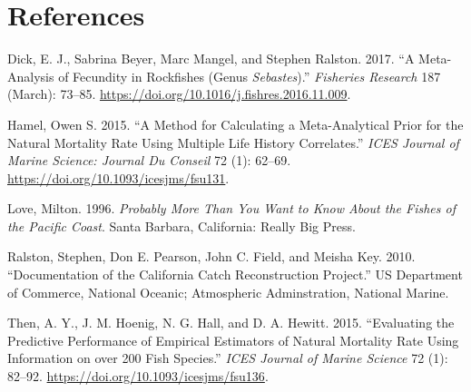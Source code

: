 \documentclass[11pt,
  english,
  a4paper,
]{article}
\begin{document}
\tagmcend\tagstructend

\clearpage


\hypertarget{references}{%
\section{References}\label{references}}

\leavevmode\tagmcend\tagstructend

\hypertarget{refs}{}
\begin{cslreferences}
\leavevmode\hypertarget{ref-dick_meta-analysis_2017}{}%
Dick, E. J., Sabrina Beyer, Marc Mangel, and Stephen Ralston. 2017. ``A Meta-Analysis of Fecundity in Rockfishes (Genus \emph{Sebastes}).'' \emph{Fisheries Research} 187 (March): 73--85. \url{https://doi.org/10.1016/j.fishres.2016.11.009}.

\leavevmode\hypertarget{ref-hamel_method_2015}{}%
Hamel, Owen S. 2015. ``A Method for Calculating a Meta-Analytical Prior for the Natural Mortality Rate Using Multiple Life History Correlates.'' \emph{ICES Journal of Marine Science: Journal Du Conseil} 72 (1): 62--69. \url{https://doi.org/10.1093/icesjms/fsu131}.

\leavevmode\hypertarget{ref-love_milton_probably_1996}{}%
Love, Milton. 1996. \emph{Probably More Than You Want to Know About the Fishes of the Pacific Coast}. Santa Barbara, California: Really Big Press.

\leavevmode\hypertarget{ref-ralston_documentation_2010}{}%
Ralston, Stephen, Don E. Pearson, John C. Field, and Meisha Key. 2010. ``Documentation of the California Catch Reconstruction Project.'' US Department of Commerce, National Oceanic; Atmospheric Adminstration, National Marine.

\leavevmode\hypertarget{ref-then_evaluating_2015-1}{}%
Then, A. Y., J. M. Hoenig, N. G. Hall, and D. A. Hewitt. 2015. ``Evaluating the Predictive Performance of Empirical Estimators of Natural Mortality Rate Using Information on over 200 Fish Species.'' \emph{ICES Journal of Marine Science} 72 (1): 82--92. \url{https://doi.org/10.1093/icesjms/fsu136}.
\end{cslreferences}
\end{document}
